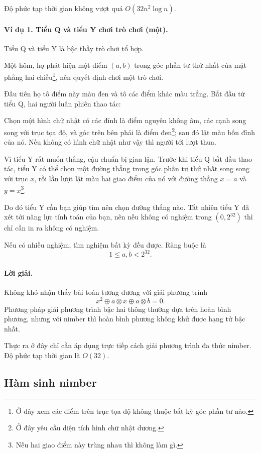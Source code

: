 \documentclass[11pt]{article}
\begin{document}
Độ phức tạp thời gian không vượt quá \(O(32n^2\log n)\).

\paragraph{Ví dụ 1. Tiểu Q và tiểu Y chơi trò chơi (một).}
Tiểu Q và tiểu Y là bậc thầy trò chơi tổ hợp.

Một hôm, họ phát hiện một điểm \((a,b)\) trong góc phần tư thứ nhất của mặt
phẳng hai chiều\footnote{Ở đây xem các điểm trên trục tọa độ không thuộc bất kỳ
góc phần tư nào.}, nên quyết định chơi một trò chơi.

Đầu tiên họ tô điểm này màu đen và tô các điểm khác màu trắng. Bắt đầu từ tiểu
Q, hai người luân phiên thao tác:

Chọn một hình chữ nhật có các đỉnh là điểm nguyên không âm, các cạnh song song
với trục tọa độ, và góc trên bên phải là điểm đen\footnote{Ở đây yêu cầu diện
tích hình chữ nhật dương.}; sau đó lật màu bốn đỉnh của nó. Nếu không có hình
chữ nhật như vậy thì người tới lượt thua.

Vì tiểu Y rất muốn thắng, cậu chuẩn bị gian lận. Trước khi tiểu Q bắt đầu thao
tác, tiểu Y có thể chọn một đường thẳng trong góc phần tư thứ nhất song song với
trục \(x\), rồi lần lượt lật màu hai giao điểm của nó với đường thẳng \(x=a\) và
\(y=x\)\footnote{Nếu hai giao điểm này trùng nhau thì không làm gì.}.

Do đó tiểu Y cần bạn giúp tìm nên chọn đường thẳng nào. Tất nhiên tiểu Y đã xét
tới năng lực tính toán của bạn, nên nếu không có nghiệm trong \((0,2^{32})\) thì
chỉ cần in ra không có nghiệm.

Nếu có nhiều nghiệm, tìm nghiệm bất kỳ đều được. Ràng buộc là
\[
  1\le a,b<2^{32}.
\]

\paragraph{Lời giải.}
Không khó nhận thấy bài toán tương đương với giải phương trình
\[
  x^2\oplus a\otimes x\oplus a\otimes b=0.
\]
Phương pháp giải phương trình bậc hai thông thường dựa trên hoàn bình phương,
nhưng với nimber thì hoàn bình phương không khử được hạng tử bậc nhất.

Thực ra ở đây chỉ cần áp dụng trực tiếp cách giải phương trình đa thức nimber.
Độ phức tạp thời gian là \(O(32)\).

\subsection{Hàm sinh nimber}
\end{document}
